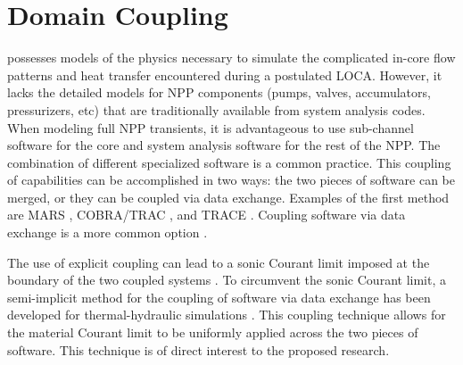 \section{Domain Coupling}
\label{sect:code_coupling}

\cobra{} possesses models of the physics necessary to simulate the complicated in-core flow patterns and heat transfer encountered during a postulated LOCA.
However, it lacks the detailed models for NPP components (pumps, valves, accumulators, pressurizers, etc) that are traditionally available from system analysis codes.
When modeling full NPP transients, it is advantageous to use sub-channel software for the core and system analysis software for the rest of the NPP.
The combination of different specialized software is a common practice.
This coupling of capabilities can be accomplished in two ways: the two pieces of software can be merged, or they can be coupled via data exchange.
Examples of the first method are MARS \cite{Jeong2008}, COBRA/TRAC \cite{Thurgood1983c}, and TRACE \cite{TRACE}.
Coupling software via data exchange is a more common option \cite{Makihara2003, Aumiller2002, Aumiller2001, Avramova2006, Weaver2002, Rodriguez2002}.

The use of explicit coupling can lead to a sonic Courant limit imposed at the boundary of the two coupled systems \cite{Ragusa2009, Aumiller2001}.
To circumvent the sonic Courant limit, a semi-implicit method for the coupling of software via data exchange has been developed for thermal-hydraulic simulations \cite{Weaver2002, Aumiller2002}.
This coupling technique allows for the material Courant limit to be uniformly applied across the two pieces of software.
This technique is of direct interest to the proposed research.

